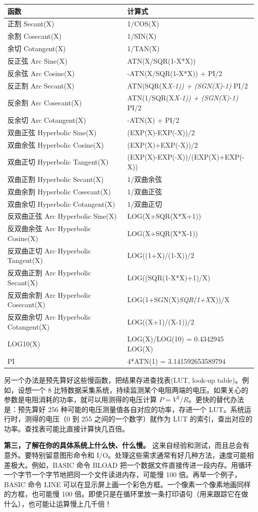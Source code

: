 {\def\LTcaptype{none} %
\begin{longtable}[]{@{}ll@{}}
\toprule\noalign{}
函数 & 计算式 \\
\midrule\noalign{}
\endhead
\bottomrule\noalign{}
\endlastfoot
正割 Secant(X) & 1/COS(X) \\
余割 Cosecant(X) & 1/SIN(X) \\
余切 Cotangent(X) & 1/TAN(X) \\
反正弦 Arc Sine(X) & ATN(X/SQR(1-X*X)) \\
反余弦 Arc Cosine(X) & -ATN(X/SQR(1-X*X)) + PI/2 \\
反正割 Arc Secant(X) & ATN(SQR(X\emph{X-1)) + (SGN(X)-1) } PI/2 \\
反余割 Arc Cosecant(X) & ATN(1/SQR(X\emph{X-1)) + (SGN(X)-1) } PI/2 \\
反余切 Arc Cotangent(X) & -ATN(X) + PI/2 \\
双曲正弦 Hyperbolic Sine(X) & (EXP(X)-EXP(-X))/2 \\
双曲余弦 Hyperbolic Cosine(X) & (EXP(X)+EXP(-X))/2 \\
双曲正切 Hyperbolic Tangent(X) & (EXP(X)-EXP(-X))/(EXP(X)+EXP(-X)) \\
双曲正割 Hyperbolic Secant(X) & 1/双曲余弦 \\
双曲余割 Hyperbolic Cosecant(X) & 1/双曲正弦 \\
双曲余切 Hyperbolic Cotangent(X) & 1/双曲正切 \\
反双曲正弦 Arc Hyperbolic Sine(X) & LOG(X+SQR(X*X+1)) \\
反双曲余弦 Arc Hyperbolic Cosine(X) & LOG(X+SQR(X*X-1)) \\
反双曲正切 Arc Hyperbolic Tangent(X) & LOG((1+X)/(1-X))/2 \\
反双曲正割 Arc Hyperbolic Secant(X) & LOG((SQR(1-X*X)+1)/X) \\
反双曲余割 Arc Hyperbolic Cosecant(X) &
LOG(1+SGN(X)\emph{SQR(1+X}X))/X \\
反双曲余切 Arc Hyperbolic Cotangent(X) & LOG((X+1)/(X-1))/2 \\
LOG10(X) & LOG(X)/LOG(10) = 0.4342945 LOG(X) \\
PI & 4*ATN(1) = 3.141592653589794 \\
\end{longtable}
}

另一个办法是预先算好这些慢函数，把结果存进查找表(LUT, look-up
table)。例如，设想一个 8
比特数据采集系统，持续监测某个电阻两端的电压。如果关心的参数是电阻消耗的功率，就可以用测得的电压计算
\(P = V^2/R\)。更快的替代办法是：预先算好 256
种可能的电压测量值各自对应的功率，存进一个
LUT。系统运行时，测得的电压（0 到 255 之间的一个数字）就作为 LUT
的索引，查出对应的功率。查找表可能比直接计算快几百倍。

\textbf{第三，了解在你的具体系统上什么快、什么慢。}
这来自经验和测试，而且总会有意外。要特别留意图形命令和
I/O。处理这些需求通常有好几种方法，速度可能相差极大。例如，BASIC 命令
BLOAD
把一个数据文件直接传进一段内存。用循环一个字节一个字节地把同一个文件读进内存，可能慢
100 倍。再举一个例子，BASIC 命令 LINE
可以在显示屏上画一个彩色方框。一个像素一个像素地画同样的方框，也可能慢
100
倍。即使只是在循环里放一条打印语句（用来跟踪它在做什么），也可能让运算慢上几千倍！
